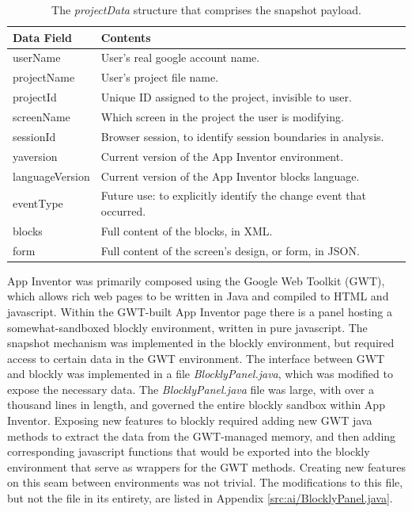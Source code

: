 \begin{table}
\begin{centering}
	\begin{tabular}{l l}
		Data Field 			& Contents \\ \hline
		userName  			& User's real google account name. \\
		projectName 		& User's project file name. 	\\
		projectId 			& Unique ID assigned to the project, invisible to user.	\\
		screenName 			& Which screen in the project the user is modifying.	\\
		sessionId 			& Browser session, to identify session boundaries in analysis.	\\
		yaversion 			& Current version of the App Inventor environment. 	\\
		languageVersion 	& Current version of the App Inventor blocks language. 	\\
		eventType 			& Future use: to explicitly identify the change event that occurred. 	\\
		blocks 				& Full content of the blocks, in XML. 	\\
		form 				& Full content of the screen's design, or form, in JSON.

	\end{tabular}
	\caption{The \emph{projectData} structure that comprises the snapshot payload.}
	\label{tab:snapshotPayload}
\end{centering}
\end{table}

App Inventor was primarily composed using the Google Web Toolkit (GWT), which allows rich web pages to be written in Java and compiled to HTML and javascript. Within the GWT-built App Inventor page there is a panel hosting a somewhat-sandboxed blockly environment, written in pure javascript. The snapshot mechanism was implemented in the blockly environment, but required access to certain data in the GWT environment. The interface between GWT and blockly was implemented in a file \emph{BlocklyPanel.java}, which was modified to expose the necessary data. The \emph{BlocklyPanel.java} file was large, with over a thousand lines in length, and governed the entire blockly sandbox within App Inventor. Exposing new features to blockly required adding new GWT java methods to extract the data from the GWT-managed memory, and then adding corresponding javascript functions that would be exported into the blockly environment that serve as wrappers for the GWT methods. Creating new features on this seam between environments was not trivial. The modifications to this file, but not the file in its entirety, are listed in Appendix \ref{src:ai/BlocklyPanel.java}.


